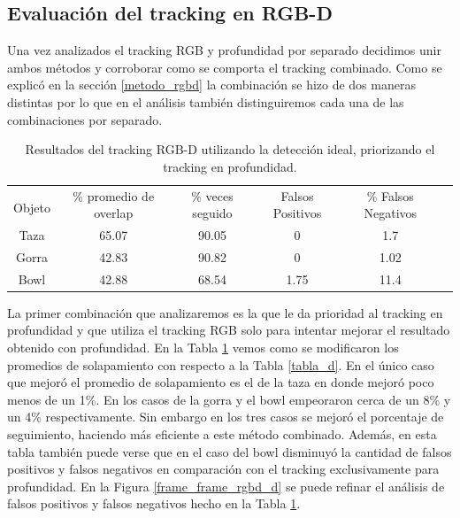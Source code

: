 \subsection{Evaluación del tracking en RGB-D}
Una vez analizados el tracking RGB y profundidad por separado decidimos unir ambos métodos y corroborar como se comporta el tracking combinado. Como se explicó en la sección \ref{metodo_rgbd} la combinación se hizo de dos maneras distintas por lo que en el análisis también distinguiremos cada una de las combinaciones por separado.

\begin{table}[h]
    \begin{tabular}{|c|c|c|c|c|c|}
    \hline
    & \multirow{2}{2.4cm}{\% promedio de overlap} & \multirow{2}{2cm}{\% veces seguido} & \multirow{2}{1.6cm}{Falsos Positivos} & \multirow{2}{1.6cm}{\% Falsos Negativos}\\
	Objeto & & & &\\
    \hline
    Taza   & 65.07      & 90.05     & 0        &   1.7 \\
    \hline
    Gorra  & 42.83      & 90.82     & 0        &  1.02 \\
    \hline
    Bowl   & 42.88      & 68.54     & 1.75     &  11.4 \\
    \hline
    \end{tabular}
\caption{Resultados del tracking RGB-D utilizando la detección ideal, priorizando el tracking en profundidad.}
\label{tabla_rgbd_d}
\end{table}

La primer combinación que analizaremos es la que le da prioridad al tracking en profundidad y que utiliza el tracking RGB solo para intentar mejorar el resultado obtenido con profundidad. En la Tabla \ref{tabla_rgbd_d} vemos como se modificaron los promedios de solapamiento con respecto a la Tabla \ref{tabla_d}. En el único caso que mejoró el promedio de solapamiento es el de la taza en donde mejoró poco menos de un 1\%. En los casos de la gorra y el bowl empeoraron cerca de un 8\% y un 4\% respectivamente. Sin embargo en los tres casos se mejoró el porcentaje de seguimiento, haciendo más eficiente a este método combinado. Además, en esta tabla también puede verse que en el caso del bowl disminuyó la cantidad de falsos positivos y falsos negativos en comparación con el tracking exclusivamente para profundidad. En la Figura \ref{frame_frame_rgbd_d} se puede refinar el análisis de falsos positivos y falsos negativos hecho en la Tabla \ref{tabla_rgbd_d}.

